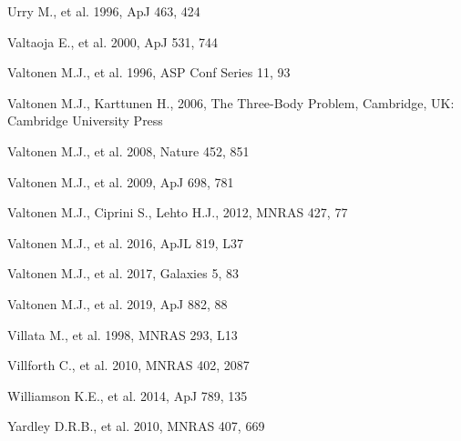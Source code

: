 \documentclass[preprints,article,accept,moreauthors,pdftex]{Definitions/mdpi}
\begin{document}
\begin{thebibliography}{999}
Urry M., et al. 1996, ApJ 463, 424

Valtaoja E., et al. 2000, ApJ 531, 744

Valtonen M.J., et al. 1996, ASP Conf Series 11, 93

Valtonen M.J.,  Karttunen H., 2006, The Three-Body Problem, Cambridge, UK: Cambridge University Press

Valtonen M.J., et al. 2008, Nature 452, 851

Valtonen M.J., et al. 2009, ApJ 698, 781

Valtonen M.J., Ciprini S., Lehto H.J., 2012, MNRAS 427, 77

Valtonen M.J., et al. 2016, ApJL 819, L37

Valtonen M.J., et al. 2017, Galaxies 5, 83 

Valtonen M.J., et al. 2019, ApJ 882, 88


Villata M., et al. 1998, MNRAS 293, L13

Villforth C., et al. 2010, MNRAS 402, 2087

Williamson K.E., et al. 2014, ApJ 789, 135

Yardley D.R.B., et al. 2010, 
MNRAS 407, 669


\end{thebibliography}
\end{document}
